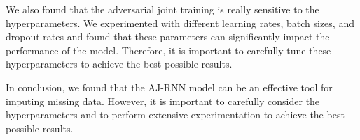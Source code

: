 We also found that the adversarial joint training is really sensitive to the hyperparameters.
We experimented with different learning rates, batch sizes, and dropout rates and found that these parameters can significantly impact the performance of the model.
Therefore, it is important to carefully tune these hyperparameters to achieve the best possible results.

In conclusion, we found that the AJ-RNN model can be an effective tool for imputing missing data. 
However, it is important to carefully consider the hyperparameters and to perform extensive experimentation to achieve the best possible results.

